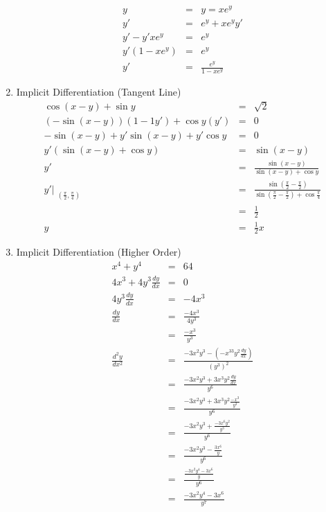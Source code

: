 \documentclass{article}
\begin{document}
\begin{enumerate}
    \begin{eqnarray}
        y &=& y = xe^y \\
        y' &=& e^y + xe^yy' \\
        y' - y'xe^y &=& e^y \\
        y'(1 - xe^y) &=& e^y \\
        y' &=& \frac{e^y}{1 - xe^y}
    \end{eqnarray}
    \item Implicit Differentiation (Tangent Line)
    \begin{eqnarray}
        \cos{(x - y)} + \sin{y} &=& \sqrt{2} \\
        \left(-\sin{(x - y)}\right)\left(1 - 1y'\right) + \cos{y}\left(y'\right) &=& 0 \\
        -\sin{(x - y)} + y'\sin{(x - y)} + y'\cos{y} &=& 0 \\
        y'\left(\sin{(x - y)} + \cos{y}\right) &=& \sin{(x - y)} \\
        y' &=& \frac{\sin{(x - y)}}{\sin{(x - y)} + \cos{y}} \\
        y'\Bigr|_{\substack{\left(\frac{\pi}{2},\frac{\pi}{4}\right)}} &=& \frac{\sin{(\frac{\pi}{2} - \frac{\pi}{2})}}{\sin{(\frac{\pi}{2} - \frac{\pi}{2})} + \cos{\frac{\pi}{4}}} \\
        &=& \frac{1}{2} \\
        y &=& \frac{1}{2}x
    \end{eqnarray}
    \item Implicit Differentiation (Higher Order)
    \begin{eqnarray}
        x^4 + y^4 &=& 64 \\
        4x^3 + 4y^3\frac{dy}{dx} &=& 0 \\
        4y^3\frac{dy}{dx} &=& -4x^3 \\
        \frac{dy}{dx} &=& \frac{-4x^3}{4y^3} \\
                      &=& \frac{-x^3}{y^3} \\
        \frac{d^2y}{dx^2} &=& \frac{-3x^2y^3 - \left(-x^33y^2\frac{dy}{dx}\right)}{\left(y^3\right)^2} \\
                          &=& \frac{-3x^2y^3 + 3x^3y^2\frac{dy}{dx}}{y^6} \\
                          &=& \frac{-3x^2y^3 + 3x^3y^2\frac{-x^3}{y^3}}{y^6} \\
                          &=& \frac{-3x^2y^3 + \frac{-3x^6y^2}{y^3}}{y^6} \\
                          &=& \frac{-3x^2y^3 - \frac{3x^6}{y}}{y^6} \\
                          &=& \frac{\frac{-3x^2y^4 - 3x^6}{y}}{y^6} \\
                          &=& \frac{-3x^2y^4 - 3x^6}{y^7}
    \end{eqnarray}
\end{enumerate}
\end{document}
